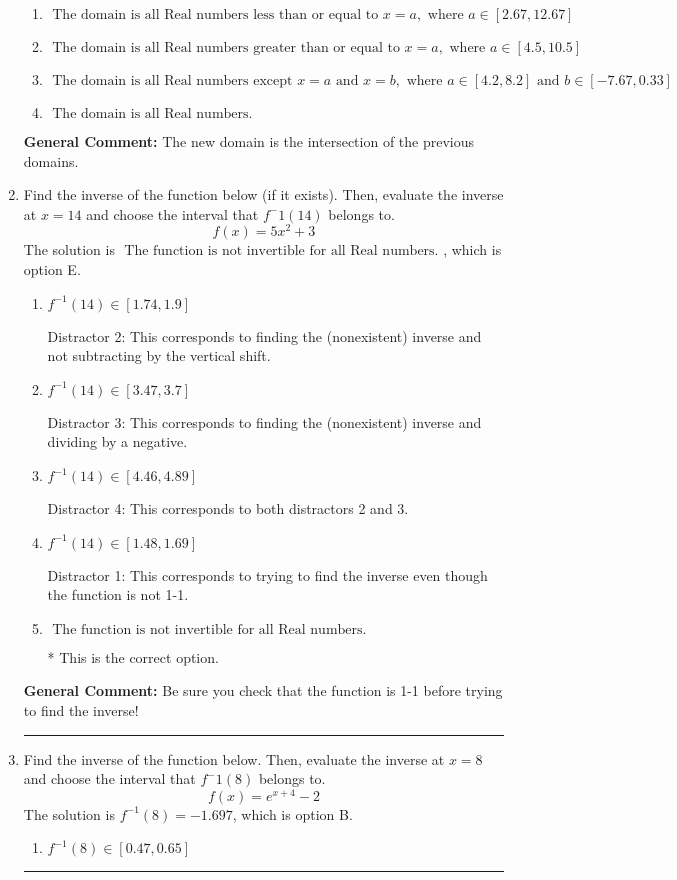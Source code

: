 \documentclass{extbook}[14pt]
\newcommand{\litem}[1]{\item #1

\rule{\textwidth}{0.4pt}}
\begin{document}
\begin{enumerate}
{\begin{enumerate}[label=\Alph*.]
\item \( \text{ The domain is all Real numbers less than or equal to } x = a, \text{ where } a \in [2.67, 12.67] \)


\item \( \text{ The domain is all Real numbers greater than or equal to } x = a, \text{ where } a \in [4.5, 10.5] \)


\item \( \text{ The domain is all Real numbers except } x = a \text{ and } x = b, \text{ where } a \in [4.2, 8.2] \text{ and } b \in [-7.67, 0.33] \)


\item \( \text{ The domain is all Real numbers. } \)


\end{enumerate}

\textbf{General Comment:} The new domain is the intersection of the previous domains.
}
\litem{
Find the inverse of the function below (if it exists). Then, evaluate the inverse at $x = 14$ and choose the interval that $f^-1(14)$ belongs to.
\[ f(x) = 5 x^2 + 3 \]The solution is \( \text{ The function is not invertible for all Real numbers. } \), which is option E.\begin{enumerate}[label=\Alph*.]
\item \( f^{-1}(14) \in [1.74, 1.9] \)

 Distractor 2: This corresponds to finding the (nonexistent) inverse and not subtracting by the vertical shift.
\item \( f^{-1}(14) \in [3.47, 3.7] \)

 Distractor 3: This corresponds to finding the (nonexistent) inverse and dividing by a negative.
\item \( f^{-1}(14) \in [4.46, 4.89] \)

 Distractor 4: This corresponds to both distractors 2 and 3.
\item \( f^{-1}(14) \in [1.48, 1.69] \)

 Distractor 1: This corresponds to trying to find the inverse even though the function is not 1-1. 
\item \( \text{ The function is not invertible for all Real numbers. } \)

* This is the correct option.
\end{enumerate}

\textbf{General Comment:} Be sure you check that the function is 1-1 before trying to find the inverse!
}
\litem{
Find the inverse of the function below. Then, evaluate the inverse at $x = 8$ and choose the interval that $f^-1(8)$ belongs to.
\[ f(x) = e^{x+4}-2 \]The solution is \( f^{-1}(8) = -1.697 \), which is option B.\begin{enumerate}[label=\Alph*.]
\item \( f^{-1}(8) \in [0.47, 0.65] \)


\end{enumerate}}
\end{enumerate}
\end{document}
